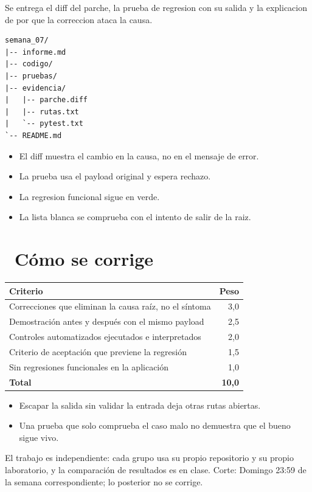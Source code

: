\documentclass[11pt,a4paper]{article}
\newcommand{\iconotexto}[2]{\textcolor{cyanNeon}{\faIcon{#1}}~#2}
\begin{document}
Se entrega el diff del parche, la prueba de regresion con su salida y la explicacion de por que la correccion ataca la causa.

\begin{lstlisting}[style=estiloCodigo]
semana_07/
|-- informe.md
|-- codigo/
|-- pruebas/
|-- evidencia/
|   |-- parche.diff
|   |-- rutas.txt
|   `-- pytest.txt
`-- README.md
\end{lstlisting}

\begin{itemize}[leftmargin=1.4em,itemsep=2pt,topsep=3pt]
  \item El diff muestra el cambio en la causa, no en el mensaje de error.
  \item La prueba usa el payload original y espera rechazo.
  \item La regresion funcional sigue en verde.
  \item La lista blanca se comprueba con el intento de salir de la raiz.
\end{itemize}

\section{\iconotexto{ruler-combined}{Cómo se corrige}}

\begin{tabularx}{\linewidth}{@{}X r@{}}
\toprule
Criterio & Peso\\
\midrule
Correcciones que eliminan la causa raíz, no el síntoma & 3,0 \\
Demostración antes y después con el mismo payload & 2,5 \\
Controles automatizados ejecutados e interpretados & 2,0 \\
Criterio de aceptación que previene la regresión & 1,5 \\
Sin regresiones funcionales en la aplicación & 1,0 \\
\midrule
\textbf{Total} & \textbf{10,0}\\
\bottomrule
\end{tabularx}

\begin{itemize}[leftmargin=1.4em,itemsep=2pt,topsep=3pt]
  \item Escapar la salida sin validar la entrada deja otras rutas abiertas.
  \item Una prueba que solo comprueba el caso malo no demuestra que el bueno sigue vivo.
\end{itemize}

\begin{cajaRecuerda}El trabajo es independiente: cada grupo usa su propio repositorio y su propio laboratorio, y la comparación de resultados es en clase. Corte: Domingo 23:59 de la semana correspondiente; lo posterior no se corrige.
\end{cajaRecuerda}
\end{document}
